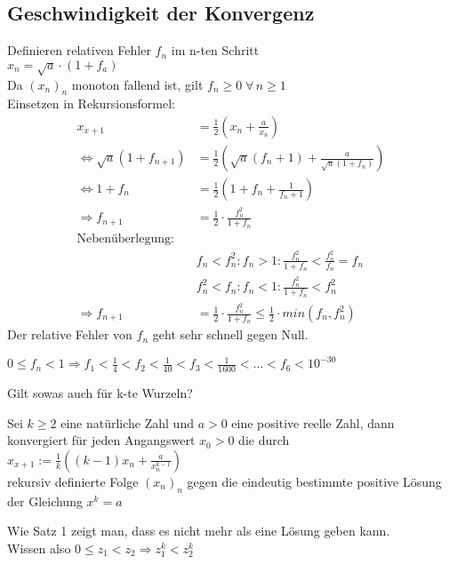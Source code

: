 \documentclass[../ana1u.tex]{subfiles}
\begin{document}
\begin{bsp}
    \subsection{Geschwindigkeit der Konvergenz}
    Definieren relativen Fehler \(f_n\) im n-ten Schritt\\
    \(x_n = \sqrt{a} \cdot (1+f_a)\)\\
    Da \((x_n)_n\) monoton fallend ist, gilt \(f_n \geq 0 \; \forall \, n \geq 1\)\\
    Einsetzen in Rekursionsformel:\\
    \begin{align*}
        x_{x+1} &= \frac{1}{2}\left(x_n + \frac{a}{x_n}\right)\\
        \Leftrightarrow \sqrt{a}(1+f_{n+1}) &= \frac{1}{2}\left(\sqrt{a}(f_n+1) + \frac{a}{\sqrt{a}(1+f_n)} \right)\\
        \Leftrightarrow 1 + f_n &= \frac{1}{2}\left(1+f_n+\frac{1}{f_n + 1}\right)\\
        \Rightarrow f_{n+1} &= \frac{1}{2} \cdot \frac{f_n^2}{1 + f_n}\\
        \text{Nebenüberlegung:}\\
        &f_n < f_n^2: f_n > 1: \frac{f_n^2}{1+f_n} < \frac{f_n^2}{f_n} = f_n\\
        &f_n^2 < f_n: f_n < 1: \frac{f_n^2}{1+f_n} < f_n^2 \\
        \Rightarrow f_{n+1} &= \frac{1}{2} \cdot \frac{f_n^2}{1+f_n} \leq \frac{1}{2} \cdot min(f_n, f_n^2)
    \end{align*}
    Der relative Fehler von \(f_n\) geht sehr schnell gegen Null.
    \begin{bsp}
        \(0\leq f_n < 1 \Rightarrow f_1 < \frac{1}{4} < f_2 < \frac{1}{40} < f_3 < \frac{1}{1600} < \ldots < f_6 < 10^{-30}\)
    \end{bsp}
    Gilt sowas auch für k-te Wurzeln?
    \begin{satz}
        Sei \(k \geq 2 \) eine natürliche Zahl und \(a > 0\) eine positive reelle Zahl, dann konvergiert für jeden Angangswert \(x_0 > 0\) die durch\\
        \(x_{x+1} := \frac{1}{k} \left((k-1)x_n + \frac{a}{x_n^{k-1}}\right)\)\\
        rekursiv definierte Folge \((x_n)_n\) gegen die eindeutig bestimmte positive Lösung der Gleichung \(x^k = a\)
    \end{satz}
    \begin{bew}
        Wie Satz 1 zeigt man, dass es nicht mehr als eine Lösung geben kann.\\Wissen also \(0 \leq z_1 < z_2 \Rightarrow z_1^k < z_2^k\)\\

\end{bew}
\end{bsp}
\end{document}
